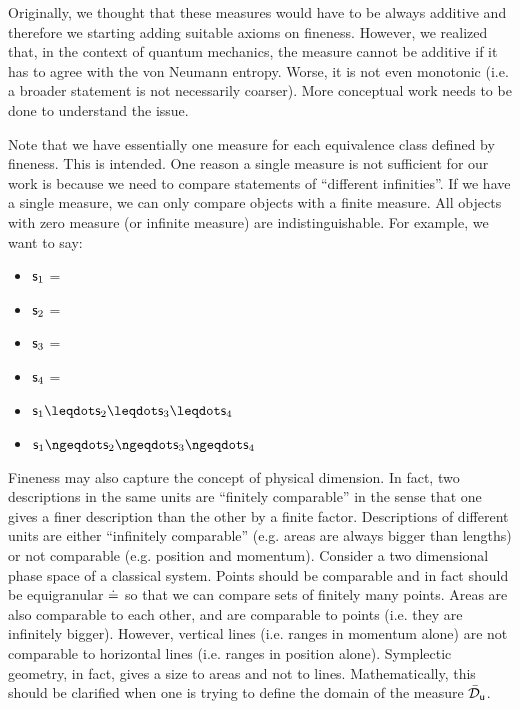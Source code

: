 \documentclass[11pt,letterpaper,fleqn]{memoir} %
\begin{document}
Originally, we thought that these measures would have to be always additive and therefore we starting adding suitable axioms on fineness. However, we realized that, in the context of quantum mechanics, the measure cannot be additive if it has to agree with the von Neumann entropy. Worse, it is not even monotonic (i.e. a broader statement is not necessarily coarser). More conceptual work needs to be done to understand the issue.

Note that we have essentially one measure for each equivalence class defined by fineness. This is intended. One reason a single measure is not sufficient for our work is because we need to compare statements of ``different infinities''. If we have a single measure, we can only compare objects with a finite measure. All objects with zero measure (or infinite measure) are indistinguishable. For example, we want to say:
\begin{itemize}
	\item $\stmt_1$ = 
	\item $\stmt_2$ = 
	\item $\stmt_3$ = 
	\item $\stmt_4$ = 
	\item $\stmt_1 \finer \stmt_2 \finer \stmt_3 \finer \stmt_4$
	\item $\stmt_1 \ncoarser \stmt_2 \ncoarser \stmt_3 \ncoarser \stmt_4$
\end{itemize}

Fineness may also capture the concept of physical dimension. In fact, two descriptions in the same units are ``finitely comparable'' in the sense that one gives a finer description than the other by a finite factor. Descriptions of different units are either ``infinitely comparable'' (e.g. areas are always bigger than lengths) or not comparable (e.g. position and momentum). Consider a two dimensional phase space of a classical system. Points should be comparable and in fact should be equigranular $\eqgran$ so that we can compare sets of finitely many points. Areas are also comparable to each other, and are comparable to points (i.e. they are infinitely bigger). However, vertical lines (i.e. ranges in momentum alone) are not comparable to horizontal lines (i.e. ranges in position alone). Symplectic geometry, in fact, gives a size to areas and not to lines. Mathematically, this should be clarified when one is trying to define the domain of the measure $\tdomain_{\stmt[u]}$.
\end{document}
